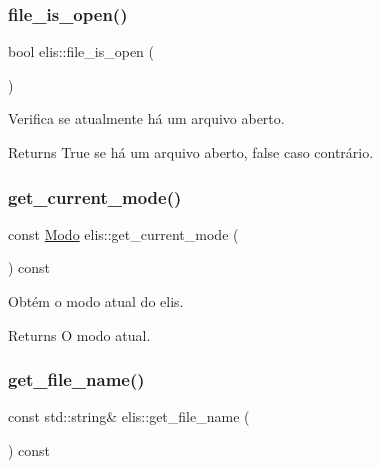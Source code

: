 \subsubsection{\texorpdfstring{file\+\_\+is\+\_\+open()}{file\_is\_open()}}
{\footnotesize\ttfamily bool elis\+::file\+\_\+is\+\_\+open (\begin{DoxyParamCaption}{ }\end{DoxyParamCaption})\hspace{0.3cm}{\ttfamily [inline]}}



Verifica se atualmente há um arquivo aberto. 

\begin{DoxyReturn}{Returns}
True se há um arquivo aberto, false caso contrário. 
\end{DoxyReturn}
\mbox{\label{classelis_a00d301532dcaf2b3079f702bc9e578e2}} 
\subsubsection{\texorpdfstring{get\+\_\+current\+\_\+mode()}{get\_current\_mode()}}
{\footnotesize\ttfamily const \hyperlink{classelis_a1d42edb1a12746c566712c4b4250769e}{Modo} elis\+::get\+\_\+current\+\_\+mode (\begin{DoxyParamCaption}{ }\end{DoxyParamCaption}) const\hspace{0.3cm}{\ttfamily [inline]}}



Obtém o modo atual do elis. 

\begin{DoxyReturn}{Returns}
O modo atual. 
\end{DoxyReturn}
\mbox{\label{classelis_ad8e03261882991d20a6ea83861a5112e}} 
\subsubsection{\texorpdfstring{get\+\_\+file\+\_\+name()}{get\_file\_name()}}
{\footnotesize\ttfamily const std\+::string\& elis\+::get\+\_\+file\+\_\+name (\begin{DoxyParamCaption}{ }\end{DoxyParamCaption}) const\hspace{0.3cm}{\ttfamily [inline]}}



